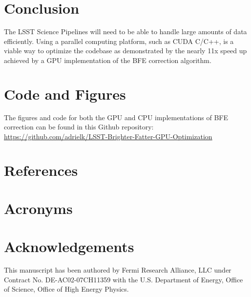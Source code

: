 \documentclass[DM,authoryear,toc]{lsstdoc}
\begin{document}
\section{Conclusion}

The LSST Science Pipelines will need to be able to handle large amounts of data efficiently. Using a parallel computing platform, such as CUDA C/C++, is a viable way to optimize the codebase as demonstrated by the nearly 11x speed up achieved by a GPU implementation of the BFE correction algorithm. 

\section{Code and Figures}

The figures and code for both the GPU and CPU implementations of BFE correction can be found in this Github repository:\newline
\url{https://github.com/adrielk/LSST-Brighter-Fatter-GPU-Optimization}

\appendix
\section{References} \label{sec:bib}
\renewcommand{\refname}{} %


\section{Acronyms} \label{sec:acronyms}


\section{Acknowledgements} \label{sec:acknowledgement}

This manuscript has been authored by Fermi Research Alliance, LLC under Contract No. DE-AC02-07CH11359 with the U.S. Department of Energy, Office of Science, Office of High Energy Physics.
\end{document}
